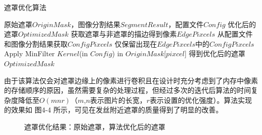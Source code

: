 \documentclass[a4paper,AutoFakeBold,oneside,12pt]{book}
\begin{document}
\begin{algorithm} 
	\begin{spacing}{1.3}
		\caption{遮罩优化算法} 
		\label{MaskOptimizationAlgorithm}
		\renewcommand{\algorithmicrequire}{\textbf{输入：}}
		\renewcommand{\algorithmicensure}{\textbf{输出：}} 
			\begin{algorithmic}[1] 
				\Require 原始遮罩$OriginMask$，图像分割结果$SegmentResult$，配置文件$Config$
				\Ensure 优化后的遮罩$OptimizedMask$
				\State 获取遮罩与非遮罩的描边得到像素$EdgePixcels$
				\State 从配置文件和图像分割结果获取$ConfigPixcels$
                \State 仅保留出现在$EdgePixcels$中的$ConfigPixcels$
                    \State Apply MinFilter $Kernel$(in $Config$) in $OriginMask$[$pixcel$]
                \EndFor
                \State 得到优化后的遮罩$OptimizedMask$
			\end{algorithmic}
	\end{spacing}
\end{algorithm}

由于该算法仅会对遮罩边缘上的像素进行卷积且在设计时充分考虑到了内存中像素的存储顺序的原因，虽然需要复杂的处理过程，但经过多次的迭代后算法的时间复杂度降低至$O(mnr)$（$m$,$n$表示图片的长宽，$r$表示设置的优化强度）。算法实现的效果如 图4-4 所示，可见在发丝附近遮罩的质量得到了明显的改善。
\begin{figure}[!htbp]
    \centering
    \quad %
    \caption{遮罩优化结果：\protect{}原始遮罩，\protect{}算法优化后的遮罩} %
    \label{Fig:MaskOptimize} %
\end{figure}
\end{document}
